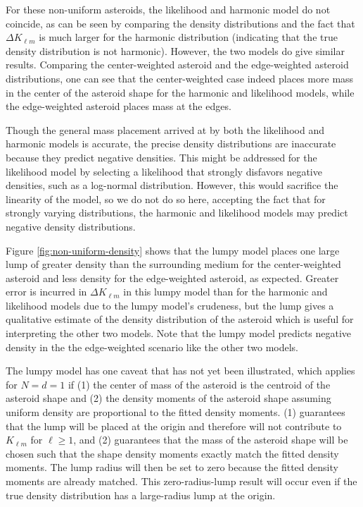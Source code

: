 \documentclass[fleqn,usenatbib]{mnras}
\begin{document}
For these non-uniform asteroids, the likelihood and harmonic model do not coincide, as can be seen by comparing the density distributions and the fact that $\Delta K_{\ell m}$ is much larger for the harmonic distribution (indicating that the true density distribution is not harmonic). However, the two models do give similar results. Comparing the center-weighted asteroid and the edge-weighted asteroid distributions, one can see that the center-weighted case indeed places more mass in the center of the asteroid shape for the harmonic and likelihood models, while the edge-weighted asteroid places mass at the edges.

Though the general mass placement arrived at by both the likelihood and harmonic models is accurate, the precise density distributions are inaccurate because they predict negative densities. This might be addressed for the likelihood model by selecting a likelihood that strongly disfavors negative densities, such as a log-normal distribution. However, this would sacrifice the linearity of the model, so we do not do so here, accepting the fact that for strongly varying distributions, the harmonic and likelihood models may predict negative density distributions.

Figure \ref{fig:non-uniform-density} shows that the lumpy model places one large lump of greater density than the surrounding medium for the center-weighted asteroid and less density for the edge-weighted asteroid, as expected. Greater error is incurred in $\Delta K_{\ell m}$ in this lumpy model than for the harmonic and likelihood models due to the lumpy model's crudeness, but the lump gives a qualitative estimate of the density distribution of the asteroid which is useful for interpreting the other two models. Note that the lumpy model predicts negative density in the the edge-weighted scenario like the other two models.


The lumpy model has one caveat that has not yet been illustrated, which applies for $N=d=1$ if (1) the center of mass of the asteroid is the centroid of the asteroid shape and (2) the density moments of the asteroid shape assuming uniform density are proportional to the fitted density moments. (1) guarantees that the lump will be placed at the origin and therefore will not contribute to $K_{\ell m}$ for $\ell \geq 1$, and (2) guarantees that the mass of the asteroid shape will be chosen such that the shape density moments exactly match the fitted density moments. The lump radius will then be set to zero because the fitted density moments are already matched. This zero-radius-lump result will occur even if the true density distribution has a large-radius lump at the origin.
\end{document}
